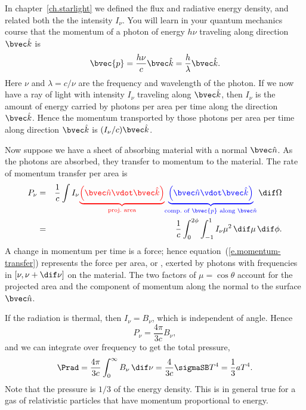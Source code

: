 \begin{sidebar}
\label{sb.radiation-pressure}
In chapter~\ref{ch.starlight} we defined the flux and radiative energy density, and related both the the intensity $I_{\nu}$. You will learn in your quantum mechanics course that the momentum of a photon of energy $h\nu$ traveling along direction $\unitk$ is
\[ \bvec{p} = \frac{h\nu}{c}\unitk = \frac{h}{\lambda}\unitk. \]
Here $\nu$ and $\lambda = c/\nu$ are the frequency and wavelength of the photon. If we now have a ray of light with intensity $I_{\nu}$ traveling along $\unitk$, then $I_{\nu}$ is the amount of energy carried by photons per area per time along the direction $\unitk$. Hence the momentum transported by those photons per area per time along direction $\unitk$ is $(I_{\nu}/c)\unitk$.

Now suppose we have a sheet of absorbing material with a normal $\unitn$. As the photons are absorbed, they transfer to momentum to the material. The rate of momentum transfer per area is
\begin{eqnarray}
P_{\nu} &=& \frac{1}{c}\int I_{\nu}
	{\color{red}\underbrace{\left(\unitn\vdot\unitk\right)}_{\textrm{proj.~area}}}
	{\color{blue}\underbrace{\left(\unitn\vdot\unitk\right)}_{\textrm{comp.\ of $\bvec{p}$ along $\unitn$}}}
	\,\dif\Omega \nonumber\\
	&=& \frac{1}{c}\int_{0}^{2\phi}\int_{-1}^{1}I_{\nu} \mu^{2}\,\dif \mu\,\dif\phi.
\label{e.momentum-transfer}
\end{eqnarray}
A change in momentum per time is a force; hence equation~(\ref{e.momentum-transfer}) represents the force per area, or , exerted by photons with frequencies in $[\nu,\nu+\dif\nu]$ on the material. The two factors of $\mu=\cos\theta$ account for the projected area and the component of momentum along the normal to the surface $\unitn$.

If the radiation is thermal, then $I_{\nu} = B_{\nu}$, which is independent of angle. Hence
\[
	P_{\nu} = \frac{4\pi}{3c}B_{\nu},
\]
and we can integrate over frequency to get the total pressure,
\begin{equation}\label{e.radiation-pressure}
	\Prad = \frac{4\pi}{3c}\int_{0}^{\infty}B_{\nu}\,\dif\nu = \frac{4}{3c}\sigmaSB T^{4} = \frac{1}{3}aT^{4}.
\end{equation}
Note that the pressure is $1/3$ of the energy density. This is in general true for a gas of relativistic particles that have momentum proportional to energy.
\end{sidebar}

